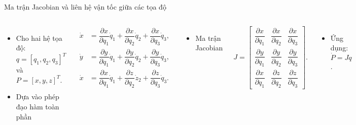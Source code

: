 \begin{frame}{Ma trận Jacobian và liên hệ vận tốc giữa các tọa độ}
    \begin{columns}
            \begin{itemize}
                \item Cho hai hệ tọa độ: \( q = \left[ q_1, q_2, q_3 \right]^T\) và \( P = \left[ x, y, z \right]^T\).
                \item Dựa vào phép đạo hàm toàn phần
            \end{itemize}
            \begin{align}
                \dot{x} &= \dfrac{\partial x}{\partial q_1} \dot{q}_1 + \dfrac{\partial x}{\partial q_2} \dot{q}_2 + \dfrac{\partial x}{\partial q_3} \dot{q}_3, \\
                \dot{y} &= \dfrac{\partial y}{\partial q_1} \dot{q}_1 + \dfrac{\partial y}{\partial q_2} \dot{q}_2 + \dfrac{\partial y}{\partial q_3} \dot{q}_3, \\
                \dot{x} &= \dfrac{\partial x}{\partial q_1} \dot{q}_1 + \dfrac{\partial z}{\partial q_2} \dot{z}_2 + \dfrac{\partial z}{\partial q_3} \dot{q}_3.
            \end{align}
            \begin{itemize}
                \item Ma trận Jacobian
            \end{itemize}
            \begin{equation}
                J = \left[ \begin{array}{ccc}
                    \dfrac{\partial x}{\partial q_1} & \dfrac{\partial x}{\partial q_2} & \dfrac{\partial x}{\partial q_3} \\
                    \dfrac{\partial y}{\partial q_1} & \dfrac{\partial y}{\partial q_2} & \dfrac{\partial y}{\partial q_3} \\
                    \dfrac{\partial x}{\partial q_1} & \dfrac{\partial z}{\partial q_2} & \dfrac{\partial z}{\partial q_3}
                \end{array} \right].
            \end{equation}
            \begin{itemize}
                \item Ứng dụng: \(\dot{P} = J \dot{q}\).
            \end{itemize}
    \end{columns}
\end{frame}

